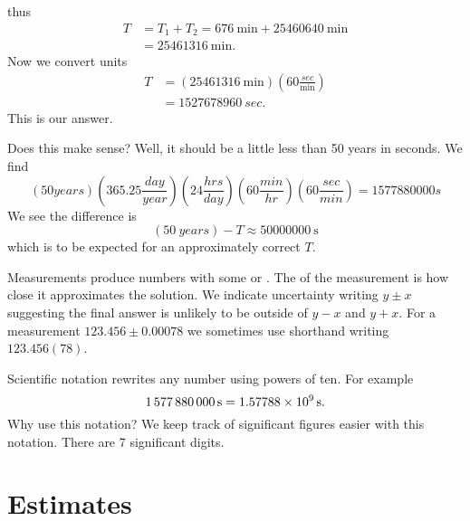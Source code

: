 thus
\begin{equation}
\begin{split}
T &= T_1+T_2 = \SI{676}{\minute} + \SI{25460640}{\minute}\\
&=\SI{25461316}{\minute}.
\end{split}
\end{equation}
Now we convert units
\begin{equation}
\begin{split}
T &= (\SI{25461316}{\minute})\left(60\frac{\si{sec}}{\si{\minute}}\right)\\
&=\SI{1527678960}{sec}.
\end{split}
\end{equation}
This is our answer.

\EVALUATE
Does this make sense? Well, it should be a little less than 50
years in seconds. We find
\begin{equation}
\!(50\si{years})
\!\!\left(365.25\frac{\si{day}}{\si{year}}\right)
\!\!\left(24\frac{\si{hrs}}{\si{day}}\right)
\!\!\left(60\frac{\si{min}}{\si{hr}}\right)
\!\!\left(60\frac{\si{sec}}{\si{min}}\right)
=1577880000\si{s}
\end{equation}
We see the difference is
\begin{equation}
(\SI{50}{years})-T\approx \SI{50000000}{\second}
\end{equation}
which is to be expected for an approximately correct $T$.

Measurements produce numbers with
some 
or . The  of the measurement is
how close it approximates the solution. We indicate uncertainty
writing $y\pm x$ suggesting the final answer is unlikely to be
outside of $y-x$ and $y+x$. For a measurement $123.456\pm0.00078$
we sometimes use shorthand writing $123.456(78)$.

Scientific notation rewrites any number using powers of ten.
For example
\begin{equation}
\SI{1577880000}{\second}
=\SI[parse-numbers = false]{1.57788\times10^{9}}{\second}.
\end{equation}
Why use this notation? We keep track of significant figures
easier with this notation. There are 7 significant digits.

\section{Estimates}

